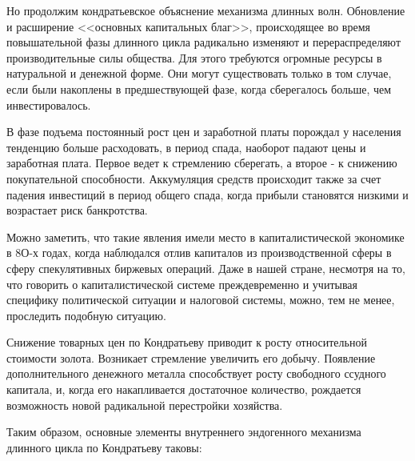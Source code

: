\documentclass[a4paper,14pt]{extarticle}
\begin{document}
 	Но продолжим кондратьевское объяснение механизма длинных волн. Обновление и расширение <<основных капитальных благ>>, происходящее во время повышательной фазы длинного цикла радикально изменяют и перераспределяют производительные силы
 	общества. Для этого требуются огромные ресурсы в натуральной и денежной форме. Они могут существовать только в том случае, если были накоплены в предшествующей фазе, когда сберегалось больше, чем инвестировалось.
 	
 	В фазе подъема постоянный рост цен и заработной платы порождал у населения тенденцию больше расходовать, в период спада, наоборот падают цены и заработная плата. Первое ведет к стремлению сберегать, а второе - к снижению покупательной способности. Аккумуляция средств происходит также за счет падения инвестиций в период общего спада, когда прибыли становятся низкими и возрастает риск банкротства.
 	
 	Можно заметить, что такие явления имели место в капиталистической экономике в 8О-х годах, когда наблюдался отлив капиталов из производственной сферы в сферу спекулятивных биржевых операций. Даже в нашей стране, несмотря на то, что говорить о капиталистической системе преждевременно и учитывая специфику политической ситуации и налоговой системы, можно, тем не менее, проследить подобную ситуацию.
 	
 	Снижение товарных цен по Кондратьеву приводит к росту относительной стоимости золота. Возникает стремление увеличить его добычу. Появление дополнительного денежного металла способствует росту свободного ссудного капитала, и, когда его накапливается достаточное количество, рождается возможность новой радикальной перестройки хозяйства.
 	
 	Таким образом, основные элементы внутреннего эндогенного механизма длинного цикла по Кондратьеву таковы:
 	
\end{document}
